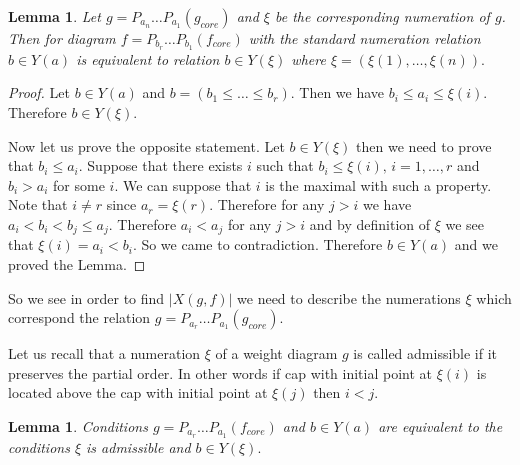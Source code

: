 \documentclass[12pt,reqno]{amsart}
\newtheorem{lemma}[thm]{Lemma}
\begin{document}
\begin{lemma}  Let $g=P_{a_n}\dots P_{a_1}(g_{core})$ and $\xi$ be the corresponding numeration of $g$. Then for diagram $f=P_{b_r}\dots P_{b_1}(f_{core})$ with the standard numeration   relation $b\in Y(a)$ is equivalent to relation $b\in Y(\xi)$ where $\xi=(\xi(1),\dots,\xi(n)).$

\end{lemma}
\begin{proof} Let $b\in Y(a)$ and  $b=(b_1\le \dots\le  b_r)$.  Then  we  have  $b_i\le a_i\le \xi(i)$. Therefore $b\in Y(\xi)$. 



Now let us prove the opposite statement. Let $b\in Y(\xi)$ then  we need to  prove that $b_i\le a_i$. Suppose that there exists $i$ such that $b_i\le \xi(i),\,i=1,\dots,r$ and $b_i>a_i$ for some $i$. We can suppose that $i$ is the maximal with such a property. Note that $i\ne r$ since $a_r=\xi(r)$. Therefore  for any $j>i$ we have  $a_i<b_i<b_j\le a_j$. Therefore $a_i<a_j$ for any $j>i$  and by definition of $\xi$ we see that $\xi(i)=a_i<b_i$. So we came to contradiction. Therefore $b\in Y(a)$ and we proved the Lemma.
\end{proof}




So we see in order to find $|X(g,f)|$ we need to describe  the numerations $\xi$ which correspond  the relation $g=P_{a_r}\dots P_{a_1}(g_{core})$.

Let us recall that a  numeration $\xi$ of a  weight diagram $g$  is called admissible if  it preserves the partial order. In other words   if cap with initial point at $\xi(i)$ is located above the cap with  initial point  at $\xi(j)$  then $i<j$. 





\begin{lemma}
  Conditions $g=P_{a_r}\dots P_{a_1}(f_{core})$ and $b\in Y(a)$ are equivalent to the conditions $\xi$ is admissible and $b\in Y(\xi).$ 
\end{lemma}
\end{document}
